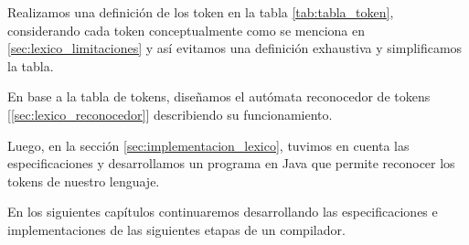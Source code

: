 Realizamos una definición de los token en la tabla \ref{tab:tabla_token}, considerando cada token conceptualmente como se menciona en \ref{sec:lexico_limitaciones} y así evitamos una definición exhaustiva y simplificamos la tabla.

En base a la tabla de tokens, diseñamos el autómata reconocedor de tokens [\ref{sec:lexico_reconocedor}] describiendo su funcionamiento.

Luego, en la sección \ref{sec:implementacion_lexico}, tuvimos en cuenta las especificaciones y desarrollamos un programa en Java que permite reconocer los tokens de nuestro lenguaje.

En los siguientes capítulos continuaremos desarrollando las especificaciones e implementaciones de las siguientes etapas de un compilador.